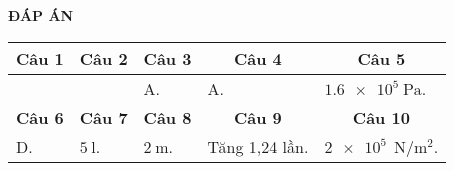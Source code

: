 \textbf{ĐÁP ÁN}
\begin{longtable}[\textwidth]{|p{}|p{}|p{}|p{}|p{}|}
	\hline%
	\multicolumn{1}{|c}{\textbf{Câu 1}} & \multicolumn{1}{|c|}{\textbf{Câu 2}} & \multicolumn{1}{c|}{\textbf{Câu 3}} &
	\multicolumn{1}{c|}{\textbf{Câu 4}} &
	\multicolumn{1}{c|}{\textbf{Câu 5}}  \\
	\hline
	&  & A. & A. & $\SI{1.6e5}{\pascal}$.	\\
	\hline
	
	\multicolumn{1}{|c|}{\textbf{Câu 6}} & \multicolumn{1}{c|}{\textbf{Câu 7}} & \multicolumn{1}{c|}{\textbf{Câu 8}} &
	\multicolumn{1}{c|}{\textbf{Câu 9}} &
	\multicolumn{1}{c|}{\textbf{Câu 10}} \\ 
	\hline
	D.  & $\SI{5}{\litre}$. & $\SI{2}{\meter}$. & Tăng 1,24 lần. & $\SI{2e5}{}$$\SI{}{\newton / \meter \squared}$. \\
	\hline
\end{longtable}			
